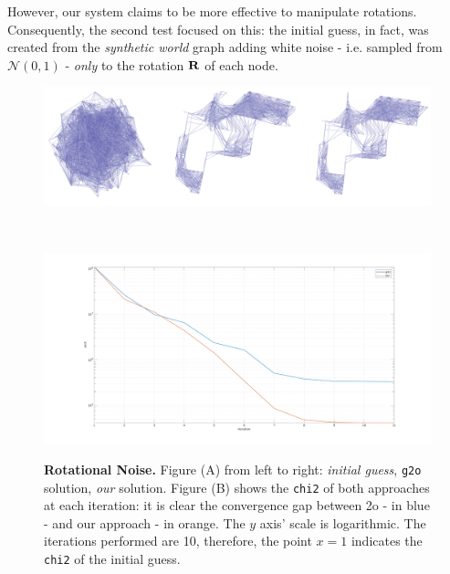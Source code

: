 However, our system claims to be more effective to manipulate rotations. Consequently, the second test focused on this: the initial guess, in fact, was created from the \textit{synthetic world} graph adding white noise - i.e. sampled from $\mathcal{N}(0,1)$ - \textit{only} to the rotation $\mathbf{R}$ of each node.

\begin{figure}[!hbt]
    \centering    
    \begin{minipage}[t!]{0.9\textwidth}
        \centering
        \includegraphics[width=\textwidth]{figures/04_solvingSe3/viewer_500p_awgn_SOLVED.png}
        \subcaption{} 
        \label{fig:500p_awgn_solution}
    \end{minipage}\\
    \begin{minipage}[t!]{0.9\textwidth}
        \centering
        \includegraphics[width=\textwidth]{figures/04_solvingSe3/500p_N0_1.pdf}
        \subcaption{}
        \label{fig:500p_awgn_chi2}
    \end{minipage}%
    \caption{\textbf{Rotational Noise.} Figure (A) from left to right: \textit{initial guess}, \texttt{g2o} solution, \textit{our} solution. Figure (B) shows the \texttt{chi2} of both approaches at each iteration: it is clear the convergence gap between \g2o - in blue - and our approach - in orange. The $y$ axis' scale is logarithmic. The iterations performed are 10, therefore, the point $x = 1$ indicates the \texttt{chi2} of the initial guess.}
    \label{fig:500p_awgn}
\end{figure}

